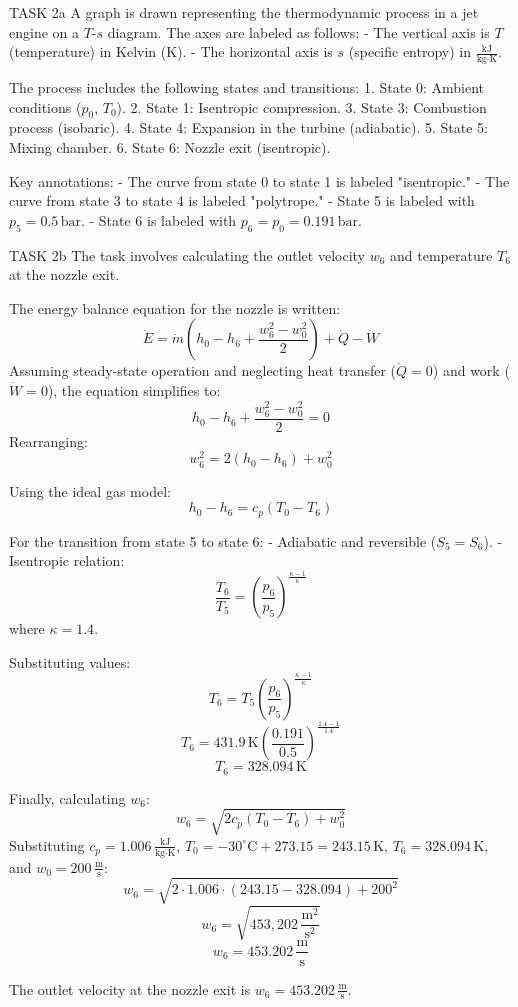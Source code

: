 TASK 2a  
A graph is drawn representing the thermodynamic process in a jet engine on a \( T \)-\( s \) diagram. The axes are labeled as follows:  
- The vertical axis is \( T \) (temperature) in Kelvin (\( \text{K} \)).  
- The horizontal axis is \( s \) (specific entropy) in \( \frac{\text{kJ}}{\text{kg·K}} \).  

The process includes the following states and transitions:  
1. State 0: Ambient conditions (\( p_0 \), \( T_0 \)).  
2. State 1: Isentropic compression.  
3. State 3: Combustion process (isobaric).  
4. State 4: Expansion in the turbine (adiabatic).  
5. State 5: Mixing chamber.  
6. State 6: Nozzle exit (isentropic).  

Key annotations:  
- The curve from state 0 to state 1 is labeled "isentropic."  
- The curve from state 3 to state 4 is labeled "polytrope."  
- State 5 is labeled with \( p_5 = 0.5 \, \text{bar} \).  
- State 6 is labeled with \( p_6 = p_0 = 0.191 \, \text{bar} \).  

TASK 2b  
The task involves calculating the outlet velocity \( w_6 \) and temperature \( T_6 \) at the nozzle exit.  

The energy balance equation for the nozzle is written:  
\[
\dot{E} = \dot{m} \left( h_0 - h_6 + \frac{w_6^2 - w_0^2}{2} \right) + \dot{Q} - \dot{W}
\]  
Assuming steady-state operation and neglecting heat transfer (\( \dot{Q} = 0 \)) and work (\( \dot{W} = 0 \)), the equation simplifies to:  
\[
h_0 - h_6 + \frac{w_6^2 - w_0^2}{2} = 0
\]  
Rearranging:  
\[
w_6^2 = 2(h_0 - h_6) + w_0^2
\]  

Using the ideal gas model:  
\[
h_0 - h_6 = c_p (T_0 - T_6)
\]  

For the transition from state 5 to state 6:  
- Adiabatic and reversible (\( S_{5} = S_{6} \)).  
- Isentropic relation:  
\[
\frac{T_6}{T_5} = \left( \frac{p_6}{p_5} \right)^{\frac{\kappa - 1}{\kappa}}
\]  
where \( \kappa = 1.4 \).  

Substituting values:  
\[
T_6 = T_5 \left( \frac{p_6}{p_5} \right)^{\frac{\kappa - 1}{\kappa}}
\]  
\[
T_6 = 431.9 \, \text{K} \left( \frac{0.191}{0.5} \right)^{\frac{1.4 - 1}{1.4}}
\]  
\[
T_6 = 328.094 \, \text{K}
\]  

Finally, calculating \( w_6 \):  
\[
w_6 = \sqrt{2 c_p (T_0 - T_6) + w_0^2}
\]  
Substituting \( c_p = 1.006 \, \frac{\text{kJ}}{\text{kg·K}} \), \( T_0 = -30^\circ\text{C} + 273.15 = 243.15 \, \text{K} \), \( T_6 = 328.094 \, \text{K} \), and \( w_0 = 200 \, \frac{\text{m}}{\text{s}} \):  
\[
w_6 = \sqrt{2 \cdot 1.006 \cdot (243.15 - 328.094) + 200^2}
\]  
\[
w_6 = \sqrt{453,202 \, \frac{\text{m}^2}{\text{s}^2}}
\]  
\[
w_6 = 453.202 \, \frac{\text{m}}{\text{s}}
\]  

The outlet velocity at the nozzle exit is \( w_6 = 453.202 \, \frac{\text{m}}{\text{s}} \).